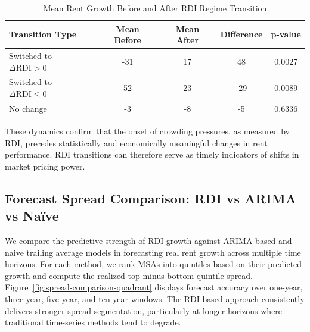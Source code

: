 \documentclass[APA,Times1COL]{WileyNJDv5} %
\begin{document}
\begin{table}[h]
	\centering
	\caption{Mean Rent Growth Before and After RDI Regime Transition}
	\label{tab:event-means}
	\begin{tabular}{lcccc} \toprule
		Transition Type & Mean Before & Mean After & Difference & p-value\\ \midrule
		Switched to $\Delta \text{RDI}>0$ & -31 & 17 & 48 & 0.0027\\
		Switched to $\Delta \text{RDI}\leq0$ & 52 & 23 & -29 & 0.0089\\
		No change & -3 & -8 & -5 & 0.6336\\
		\bottomrule
	\end{tabular}
\end{table}

These dynamics confirm that the onset of crowding pressures, as measured by RDI, precedes statistically and economically meaningful changes in rent performance. RDI transitions can therefore serve as timely indicators of shifts in market pricing power.


\subsection{Forecast Spread Comparison: RDI vs ARIMA vs Naïve}
We compare the predictive strength of RDI growth against ARIMA-based and naive trailing average models in forecasting real rent growth across multiple time horizons. For each method, we rank MSAs into quintiles based on their predicted growth and compute the realized top-minus-bottom quintile spread.
Figure~\ref{fig:spread-comparison-quadrant} displays forecast accuracy over one-year, three-year, five-year, and ten-year windows. The RDI-based approach consistently delivers stronger spread segmentation, particularly at longer horizons where traditional time-series methods tend to degrade.
\end{document}
